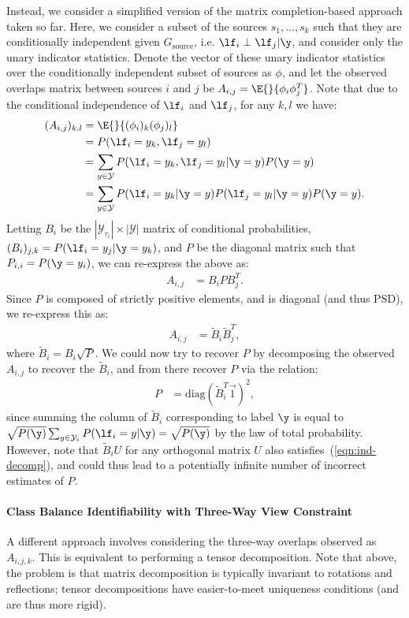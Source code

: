 \documentclass[letterpaper]{article}
\begin{document}
\begin{appendix}
Instead, we consider a simplified version of the matrix completion-based approach taken so far.
Here, we consider a subset of the sources $s_1,\ldots ,s_k$ such that they are conditionally independent given $G_{\text{source}}$, i.e. $\lf_i \perp \lf_j | \y$, and consider only the unary indicator statistics.
Denote the vector of these unary indicator statistics over the conditionally independent subset of sources as $\phi$, and let the observed overlaps matrix between sources $i$ and $j$ be $A_{i,j} = \E{}{ \phi_i\phi_j^T }$.
Note that due to the conditional independence of $\lf_i$ and $\lf_j$, for any $k,l$ we have:
\begin{align*}
	(A_{i,j})_{k,l}
	&=
	\E{}{ (\phi_i)_k (\phi_j)_l } \\
	&=
	P(\lf_i=y_k, \lf_j=y_l) \\
	&=
	\sum_{y \in \mathcal{Y}} P(\lf_i=y_k, \lf_j=y_l | \y=y) P(\y=y) \\
	&=
	\sum_{y \in \mathcal{Y}} P(\lf_i=y_k | \y=y) P(\lf_j=y_l | \y=y) P(\y=y).
\end{align*}
Letting $B_i$ be the $|\mathcal{Y}_{\tau_i}| \times |\mathcal{Y}|$ matrix of conditional probabilities, $(B_i)_{j,k} = P(\lf_i=y_j | \y=y_k)$, and $P$ be the diagonal matrix such that $P_{i,i} = P(\y=y_i)$, we can re-express the above as:
\begin{align*}
	A_{i,j}
	&=
	B_i P B_j^T.
\end{align*}
Since $P$ is composed of strictly positive elements, and is diagonal (and thus PSD), we re-express this as:
\begin{align}
	\label{eqn:ind-decomp}
	A_{i,j}
	&=
	\tilde{B}_i \tilde{B}_j^T,
\end{align}
where $\tilde{B}_i = B_i \sqrt{P}$.
We could now try to recover $P$ by decomposing the observed $A_{i,j}$ to recover the $\tilde{B}_i$, and from there recover $P$ via the relation:
\begin{align}
	\label{eqn:p-recovery}
	P
	&=
	\text{diag}\left( \tilde{B}_i^T\vec{1} \right)^2,
\end{align}
since summing the column of $\tilde{B}_i$ corresponding to label $\y$ is equal to $\sqrt{P(\y)} \sum_{y \in \mathcal{Y}_i} P(\lf_i = y | \y) = \sqrt{P(\y)}$ by the law of total probability.
However, note that $\tilde{B}_i U$ for any orthogonal matrix $U$ also satisfies~(\ref{eqn:ind-decomp}), and could thus lead to a potentially infinite number of incorrect estimates of $P$.

\paragraph*{Class Balance Identifiability with Three-Way View Constraint}
A different approach involves considering the three-way overlaps observed as $A_{i,j,k}$.
This is equivalent to performing a tensor decomposition.
Note that above, the problem is that matrix decomposition is typically invariant to rotations and reflections; tensor decompositions have easier-to-meet uniqueness conditions (and are thus more rigid).


\end{appendix}
\end{document}
